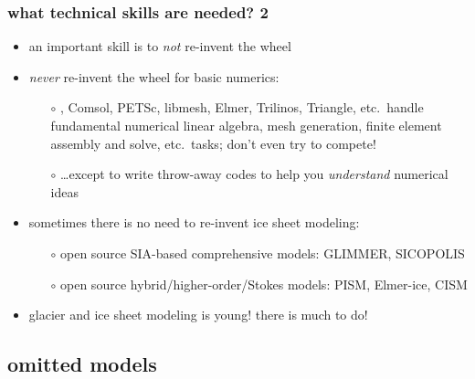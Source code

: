 \begin{frame}
\frametitle{what technical skills are needed? 2}

\begin{itemize}
\item an important skill is to \emph{not} re-invent the wheel
\item \emph{never} re-invent the wheel for basic numerics:
  \begin{itemize}
  \item[$\circ$] \Matlab, Comsol, PETSc, libmesh, Elmer, Trilinos, Triangle, etc.~handle fundamental numerical linear algebra, mesh generation, finite element assembly and solve, etc.~tasks; don't even try to compete!
  \item[$\circ$] \dots except to write throw-away codes to help you \emph{understand} numerical ideas 
  \end{itemize}
\item sometimes there is no need to re-invent ice sheet modeling:
  \begin{itemize}
  \item[$\circ$] open source SIA-based comprehensive models: GLIMMER, SICOPOLIS
  \item[$\circ$] open source hybrid/higher-order/Stokes models: PISM, Elmer-ice, CISM
  \end{itemize}
\item glacier and ice sheet modeling is young!  there is much to do!
\end{itemize}
\end{frame}


\subsection{omitted models}

